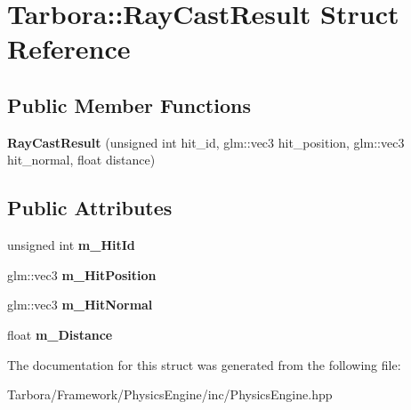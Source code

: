 \hypertarget{structTarbora_1_1RayCastResult}{}\section{Tarbora\+:\+:Ray\+Cast\+Result Struct Reference}
\label{structTarbora_1_1RayCastResult}
\subsection*{Public Member Functions}
\begin{DoxyCompactItemize}
\item 
\mbox{\label{structTarbora_1_1RayCastResult_a674498bc9942459b0eb005bcce7779d4}} 
{\bfseries Ray\+Cast\+Result} (unsigned int hit\+\_\+id, glm\+::vec3 hit\+\_\+position, glm\+::vec3 hit\+\_\+normal, float distance)
\end{DoxyCompactItemize}
\subsection*{Public Attributes}
\begin{DoxyCompactItemize}
\item 
\mbox{\label{structTarbora_1_1RayCastResult_a608cfb023836681d1adc3205ef7ad3de}} 
unsigned int {\bfseries m\+\_\+\+Hit\+Id}
\item 
\mbox{\label{structTarbora_1_1RayCastResult_aae56ef47d4a2bba64627453315db4456}} 
glm\+::vec3 {\bfseries m\+\_\+\+Hit\+Position}
\item 
\mbox{\label{structTarbora_1_1RayCastResult_a66f525e0574bf2f041e2a579654e7e1a}} 
glm\+::vec3 {\bfseries m\+\_\+\+Hit\+Normal}
\item 
\mbox{\label{structTarbora_1_1RayCastResult_af39905775d038faa1e6236dfac4e3622}} 
float {\bfseries m\+\_\+\+Distance}
\end{DoxyCompactItemize}


The documentation for this struct was generated from the following file\+:\begin{DoxyCompactItemize}
\item 
Tarbora/\+Framework/\+Physics\+Engine/inc/Physics\+Engine.\+hpp\end{DoxyCompactItemize}
